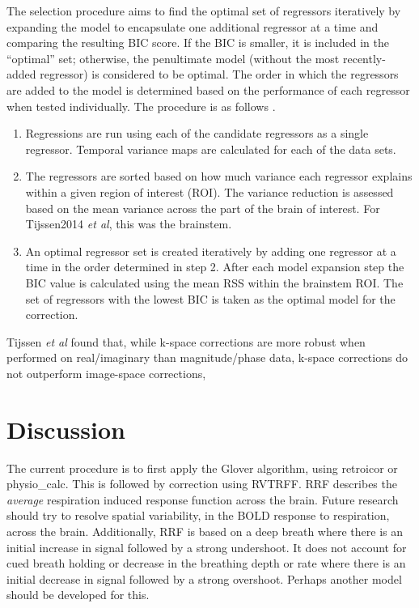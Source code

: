 \documentclass[twoside,twocolumn]{article}
\begin{document}
The selection procedure aims to find the optimal set of regressors iteratively by expanding the model to encapsulate one additional regressor at a time and comparing the resulting BIC score. If the BIC is smaller, it is included in the ``optimal'' set; otherwise, the penultimate model (without the most recently-added regressor) is considered to be optimal. The order in which the regressors are added to the model is determined based on the performance of each regressor when tested individually. The procedure is as follows \cite{Tijssen2014}.
\begin{enumerate}
	\item Regressions are run using each of the candidate regressors as a single regressor. Temporal variance maps are calculated for each of the data sets.
	\item The regressors are sorted based on how much variance each regressor explains within a given region of interest (ROI). The variance reduction is assessed based on the mean variance across the part of the brain of interest.  For Tijssen2014 {\em et al}\cite{Tijssen2014},  this was the brainstem.
	\item An optimal regressor set is created iteratively by adding one regressor at a time in the order determined in step 2. After each model expansion step the BIC value is calculated using the mean RSS within the brainstem ROI. The set of regressors with the lowest BIC is taken as the optimal model for the correction.
\end{enumerate}

Tijssen {\em et al}\cite{Tijssen2014}  found that, while k-space corrections are more robust when performed on real/imaginary than magnitude/phase data, k-space corrections do not outperform image-space corrections,

\section{Discussion}

The current procedure is to first apply the Glover\cite{Glover2000} algorithm, using retroicor or physio\_calc.  This is followed by correction using RVTRFF.  RRF describes the {\em average} respiration induced response function across the brain.  Future research should try to resolve spatial variability, in the BOLD response to respiration, across the brain.  Additionally, RRF is based on a deep breath where there is an initial increase in signal followed by a strong undershoot.  It does not account for cued breath holding or decrease in the breathing depth or rate where there is an initial decrease in signal followed by a strong overshoot.  Perhaps another model should be developed for this.
 
\end{document}
